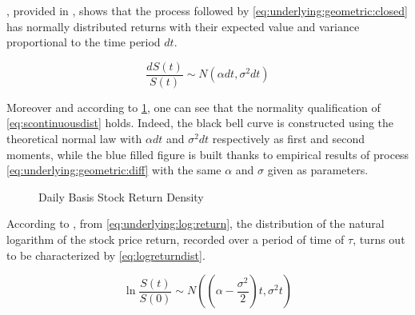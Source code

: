 \documentclass[a4paper, 12pt]{report}
\newcommand{\St}{S\left(t\right)}
\newcommand{\dSt}{dS\left(t\right)}
\newcommand{\dSr}{\frac{\dSt}{\St}}
\begin{document}
, provided in \citet{shreve},  shows that the process followed by \cref{eq:underlying:geometric:closed} has normally distributed returns with their expected value and variance proportional to the time period $dt$.

\begin{center}
\begin{equation}
\dSr \sim N(\alpha dt, \sigma^2 dt)
\label{eq:scontinuousdist}
\end{equation}
\end{center}  
Moreover and according to \cref{p:returndensity}, one can see that the normality qualification of \cref{eq:scontinuousdist} holds. 
Indeed, the black bell curve is constructed using the theoretical normal law with $\alpha dt$ and $\sigma^2 dt$ respectively as first and second moments, while the blue filled figure is built thanks to empirical results of process \ref{eq:underlying:geometric:diff} with the same $\alpha$ and $\sigma$ given as parameters.

 
\begin{figure}[!h]
\centering

\caption{Daily Basis Stock Return Density}
\label{p:returndensity}
\end{figure}













According to \citet{shreve}, from \cref{eq:underlying:log:return}, the distribution of the natural logarithm of the stock price return, recorded over a period of time of $\tau$, turns out to be characterized by \cref{eq:logreturndist}.



\begin{center}
\begin{equation}
\ln{\frac{\St}{S\left(0\right)}} 
  \sim N((\alpha - \frac{\sigma^2}{2}) t, \sigma^2 t)
\label{eq:logreturndist}
\end{equation}
\end{center}  
\end{document}
